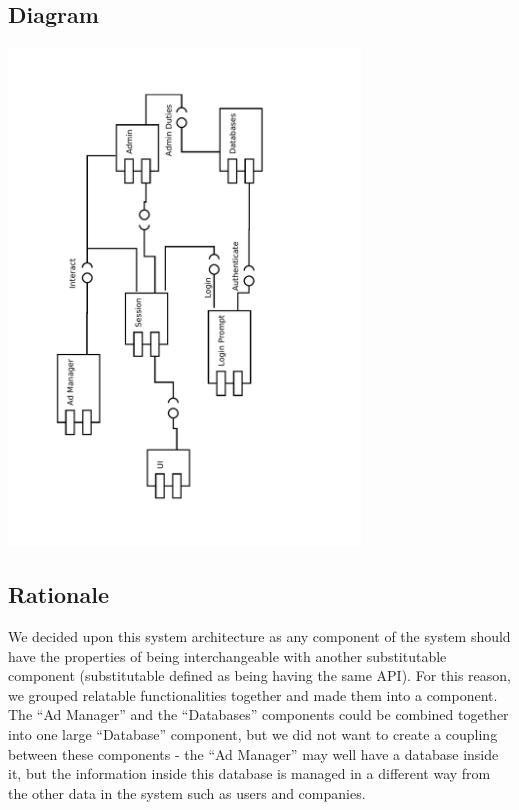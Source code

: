 \documentclass[11pt]{article}
\begin{document}
\subsection{Diagram}

\begin{centering}
  \includegraphics[width=0.7\textwidth,angle=270]{PSDDiagram.pdf}
\end{centering}

\subsection{Rationale}

We decided upon this system architecture as any component of the system should 
have the properties of being interchangeable with another substitutable 
component (substitutable defined as being having the same API). For this reason, 
we grouped relatable functionalities together and made them into a component. 
The ``Ad Manager'' and the ``Databases'' components could be combined together 
into one large ``Database'' component, but we did not want to create a coupling 
between these components - the ``Ad Manager'' may well have a database inside 
it, but the information inside this database is managed in a different way from 
the other data in the system such as users and companies.
\end{document}
